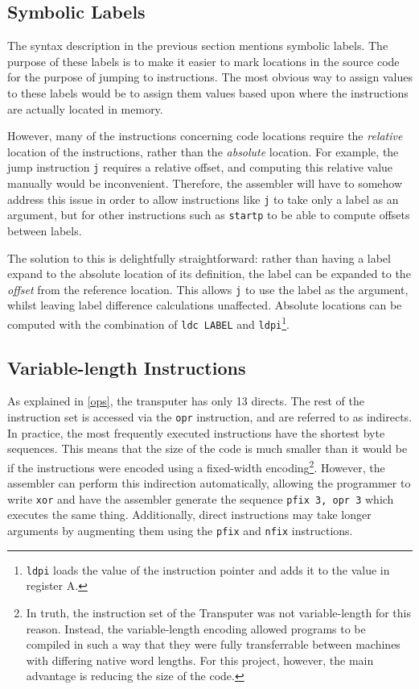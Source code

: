 \subsection{Symbolic Labels}

The syntax description in the previous section mentions symbolic labels. The
purpose of these labels is to make it easier to mark locations in the source
code for the purpose of jumping to instructions. The most obvious way to assign
values to these labels would be to assign them values based upon where the
instructions are actually located in memory.

However, many of the instructions concerning code locations require the
\textit{relative} location of the instructions, rather than the
\textit{absolute} location. For example, the jump instruction \texttt{j}
requires a relative offset, and computing this relative value manually would be
inconvenient. Therefore, the assembler will have to somehow address this issue
in order to allow instructions like \texttt{j} to take only a label as an
argument, but for other instructions such as \texttt{startp} to be able to
compute offsets between labels.

The solution to this is delightfully straightforward: rather than having a label
expand to the absolute location of its definition, the label can be expanded to
the \textit{offset} from the reference
location\textsuperscript{\cite{supervisor}}. This allows \texttt{j} to use the
label as the argument, whilst leaving label difference calculations unaffected.
Absolute locations can be computed with the combination of \texttt{ldc LABEL}
and \texttt{ldpi}\footnote{\texttt{ldpi} loads the value of the instruction
pointer and adds it to the value in register A.}.

\subsection{Variable-length Instructions}

As explained in \ref{ops}, the \Gls{transputer} has only 13 \gls{direct}s. The
rest of the instruction set is accessed via the \texttt{opr} instruction, and
are referred to as \gls{indirect}s. In practice, the most frequently executed
instructions have the shortest byte sequences. This means that the size of the
code is much smaller than it would be if the instructions were encoded using a
fixed-width encoding\footnote{In truth, the instruction set of the Transputer
was not variable-length for this reason. Instead, the variable-length encoding
allowed programs to be compiled in such a way that they were fully transferrable
between machines with differing native word lengths. For this project, however,
the main advantage is reducing the size of the code.}. However, the assembler
can perform this indirection automatically, allowing the programmer to write
\texttt{xor} and have the assembler generate the sequence \texttt{pfix 3, opr 3}
which executes the same thing. Additionally, direct instructions may take longer
arguments by augmenting them using the \texttt{pfix} and \texttt{nfix}
instructions.

